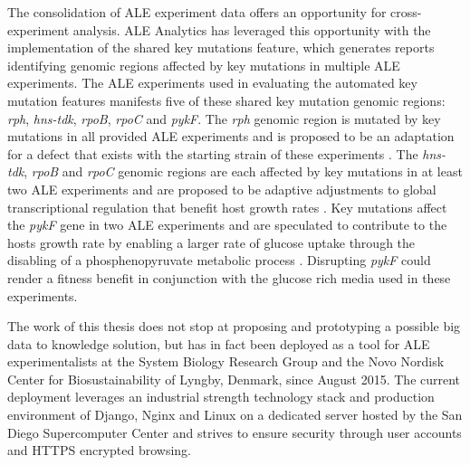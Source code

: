 \documentclass[12pt,final,masters,chapterheads]{ucsd}  %
\begin{document}
The consolidation of ALE experiment data offers an opportunity for cross-experiment analysis. ALE Analytics has leveraged this opportunity with the implementation of the shared key mutations feature, which generates reports identifying genomic regions affected by key mutations in multiple ALE experiments. The ALE experiments used in evaluating the automated key mutation features manifests five of these shared key mutation genomic regions: \textit{rph}, \textit{hns-tdk}, \textit{rpoB}, \textit{rpoC} and \textit{pykF}. The \textit{rph} genomic region is mutated by key mutations in all provided ALE experiments and is proposed to be an adaptation for a defect that exists with the starting strain of these experiments \cite{Conrad2009}. The \textit{hns-tdk}, \textit{rpoB} and \textit{rpoC} genomic regions are each affected by key mutations in at least two ALE experiments and are proposed to be adaptive adjustments to global transcriptional regulation that benefit host growth rates \cite{Kobayashi01011990, AYERS1989749, Cheng2014, Wang1445}. Key mutations affect the \textit{pykF} gene in two ALE experiments and are speculated to contribute to the hosts growth rate by enabling a larger rate of glucose uptake through the disabling of a phosphenopyruvate metabolic process \cite{Woods13062006, 10.1371/journal.pgen.1001164, Blank25022014}. Disrupting \textit{pykF} could render a fitness benefit in conjunction with the glucose rich media used in these experiments.

The work of this thesis does not stop at proposing and prototyping a possible big data to knowledge solution, but has in fact been deployed as a tool for ALE experimentalists at the System Biology Research Group and the Novo Nordisk Center for Biosustainability of Lyngby, Denmark, since August 2015. The current deployment leverages an industrial strength technology stack and production environment of Django, Nginx and Linux on a dedicated server hosted by the San Diego Supercomputer Center and strives to ensure security through user accounts and HTTPS encrypted browsing.%
\end{document}

